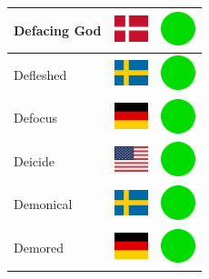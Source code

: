 \documentclass[12pt, a4paper, twoside]{report}
\begin{document}
\begin{center}
\begin{longtable}{|p{5cm}|p{2cm}|p{2cm}|}
 Defacing God                                               & \includegraphics[width=1cm]{../4x3/dk} &   \includegraphics[width=1cm]{../likes/y} \\ \hline
 Defleshed                                                  & \includegraphics[width=1cm]{../4x3/se} &   \includegraphics[width=1cm]{../likes/y} \\ \hline
 Defocus                                                    & \includegraphics[width=1cm]{../4x3/de} &   \includegraphics[width=1cm]{../likes/y} \\ \hline
 Deicide                                                    & \includegraphics[width=1cm]{../4x3/us} &   \includegraphics[width=1cm]{../likes/y} \\ \hline
 Demonical                                                  & \includegraphics[width=1cm]{../4x3/se} &   \includegraphics[width=1cm]{../likes/y} \\ \hline
 Demored                                                    & \includegraphics[width=1cm]{../4x3/de} &   \includegraphics[width=1cm]{../likes/y} \\ \hline

\end{longtable}
\end{center}
\end{document}
